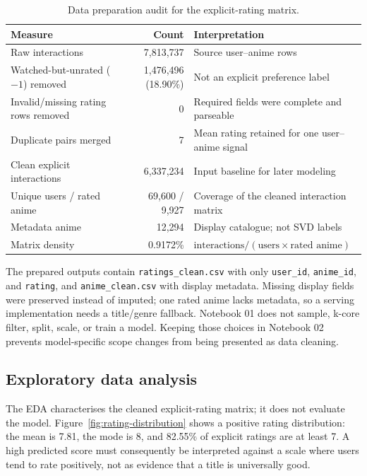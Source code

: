 \documentclass[12pt,a4paper]{article}
\begin{document}
\begin{table}[H]
  \centering
  \caption{Data preparation audit for the explicit-rating matrix.}
  \label{tab:cleaning}
  \begin{tabularx}{\linewidth}{Y r Y}
    \toprule
    \textbf{Measure} & \textbf{Count} & \textbf{Interpretation} \\
    \midrule
    Raw interactions & 7,813,737 & Source user--anime rows \\
    Watched-but-unrated ($-1$) removed & 1,476,496 (18.90\%) & Not an explicit preference label \\
    Invalid/missing rating rows removed & 0 & Required fields were complete and parseable \\
    Duplicate pairs merged & 7 & Mean rating retained for one user--anime signal \\
    Clean explicit interactions & 6,337,234 & Input baseline for later modeling \\
    Unique users / rated anime & 69,600 / 9,927 & Coverage of the cleaned interaction matrix \\
    Metadata anime & 12,294 & Display catalogue; not SVD labels \\
    Matrix density & 0.9172\% & $\text{interactions}/(\text{users}\times\text{rated anime})$ \\
    \bottomrule
  \end{tabularx}
\end{table}

The prepared outputs contain \texttt{ratings\_clean.csv} with only \texttt{user\_id}, \texttt{anime\_id}, and \texttt{rating}, and \texttt{anime\_clean.csv} with display metadata. Missing display fields were preserved instead of imputed; one rated anime lacks metadata, so a serving implementation needs a title/genre fallback. Notebook 01 does not sample, k-core filter, split, scale, or train a model. Keeping those choices in Notebook 02 prevents model-specific scope changes from being presented as data cleaning.

\subsection{Exploratory data analysis}
The EDA characterises the cleaned explicit-rating matrix; it does not evaluate the model. Figure~\ref{fig:rating-distribution} shows a positive rating distribution: the mean is 7.81, the mode is 8, and 82.55\% of explicit ratings are at least 7. A high predicted score must consequently be interpreted against a scale where users tend to rate positively, not as evidence that a title is universally good.
\end{document}
